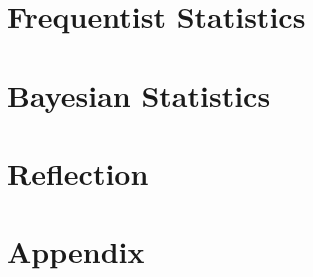 \documentclass[
		twoside,
		openright,
		titlepage,
		numbers=noenddot,
		headinclude,%
	 	footinclude=true,
	 	cleardoublepage=empty,
		dottedtoc, %
		BCOR=5mm,
		fontsize=11pt, %
		ngerman,
		american, %
		pagesize=pdftex,
		]{scrbook}
\begin{document}
\cleardoublepage %

\part{Frequentist Statistics} %
\label{part:frequentist}



\cleardoublepage %

\part{Bayesian Statistics} %
\label{part:bayesian}

 












\part{Reflection}


\cleardoublepage %



\appendix

\part{Appendix} %






\cleardoublepage %
\cleardoublepage %
\end{document}
